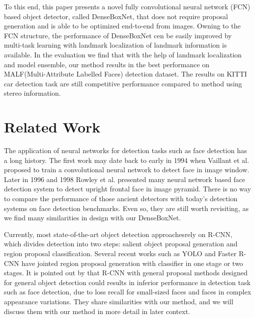 To this end, this paper presents a novel fully convolutional neural network (FCN)\cite{long2014fully} based object detector, called DenseBoxNet, that does not require proposal generation and is able to be optimized end-to-end from images.  Owning to the FCN structure,  the performance of DenseBoxNet cen be easily improved by multi-task learning with landmark localization of landmark information is available.  In the evaluation we find that with the help of landmark localization and model ensemble, our method results in the best performance on MALF(Multi-Attribute Labelled Faces)\cite{faceevaluation15} detection dataset. The results on KITTI\cite{Geiger2012CVPR} car detection task are still competitive performance   compared to method using stereo information. 

\section{Related Work}

 


The application of neural networks for detection tasks such as face detection has a long history. The first work may date back to early in 1994 when Vaillant et al.\cite{vaillant1994original} proposed to train a convolutional neural network to detect face in image window.  Later in 1996 and 1998 Rowley et al.\cite{rowley1998neural,rowley1998rotation} presented many neural network based face detection system to detect upright frontal face in image pyramid. There is no way to compare the performance of those ancient detectors with today’s detection systems on face detection benchmarks. Even so, they are still worth revisiting, as we find many similarities in design with our DenseBoxNet. 

Currently, most state-of-the-art object detection approaches\cite{ouyang2014deepid, li2015convolutional, erhan2014scalable,girshick2015fast}rely on R-CNN, which divides detection into two steps: salient object proposal generation and region proposal classification. Several recent works such as YOLO and Faster R-CNN have jointed region proposal generation with classifier in one stage or two stages. It is pointed out by \cite{farfade2015multi} that R-CNN with general proposal methods designed for general object detection could results in inferior performance in detection task such as face detection, due to loss recall for small-sized faces and faces in complex appearance variations. They share similarities with our method, and we will discuss them with our method in more detail in later context.  
 

